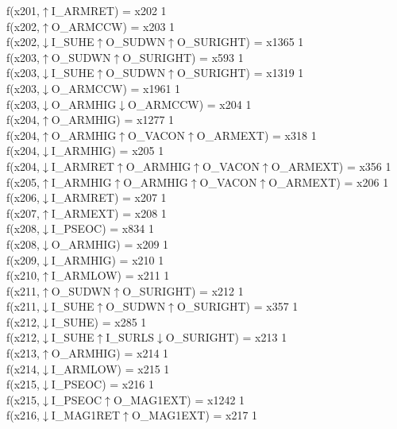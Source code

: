 f(x201,$\uparrow$I\_ARMRET) = x202 {1} \\
f(x202,$\uparrow$O\_ARMCCW) = x203 {1} \\
f(x202,$\downarrow$I\_SUHE$\uparrow$O\_SUDWN$\uparrow$O\_SURIGHT) = x1365 {1} \\
f(x203,$\uparrow$O\_SUDWN$\uparrow$O\_SURIGHT) = x593 {1} \\
f(x203,$\downarrow$I\_SUHE$\uparrow$O\_SUDWN$\uparrow$O\_SURIGHT) = x1319 {1} \\
f(x203,$\downarrow$O\_ARMCCW) = x1961 {1} \\
f(x203,$\downarrow$O\_ARMHIG$\downarrow$O\_ARMCCW) = x204 {1} \\
f(x204,$\uparrow$O\_ARMHIG) = x1277 {1} \\
f(x204,$\uparrow$O\_ARMHIG$\uparrow$O\_VACON$\uparrow$O\_ARMEXT) = x318 {1} \\
f(x204,$\downarrow$I\_ARMHIG) = x205 {1} \\
f(x204,$\downarrow$I\_ARMRET$\uparrow$O\_ARMHIG$\uparrow$O\_VACON$\uparrow$O\_ARMEXT) = x356 {1} \\
f(x205,$\uparrow$I\_ARMHIG$\uparrow$O\_ARMHIG$\uparrow$O\_VACON$\uparrow$O\_ARMEXT) = x206 {1} \\
f(x206,$\downarrow$I\_ARMRET) = x207 {1} \\
f(x207,$\uparrow$I\_ARMEXT) = x208 {1} \\
f(x208,$\downarrow$I\_PSEOC) = x834 {1} \\
f(x208,$\downarrow$O\_ARMHIG) = x209 {1} \\
f(x209,$\downarrow$I\_ARMHIG) = x210 {1} \\
f(x210,$\uparrow$I\_ARMLOW) = x211 {1} \\
f(x211,$\uparrow$O\_SUDWN$\uparrow$O\_SURIGHT) = x212 {1} \\
f(x211,$\downarrow$I\_SUHE$\uparrow$O\_SUDWN$\uparrow$O\_SURIGHT) = x357 {1} \\
f(x212,$\downarrow$I\_SUHE) = x285 {1} \\
f(x212,$\downarrow$I\_SUHE$\uparrow$I\_SURLS$\downarrow$O\_SURIGHT) = x213 {1} \\
f(x213,$\uparrow$O\_ARMHIG) = x214 {1} \\
f(x214,$\downarrow$I\_ARMLOW) = x215 {1} \\
f(x215,$\downarrow$I\_PSEOC) = x216 {1} \\
f(x215,$\downarrow$I\_PSEOC$\uparrow$O\_MAG1EXT) = x1242 {1} \\
f(x216,$\downarrow$I\_MAG1RET$\uparrow$O\_MAG1EXT) = x217 {1} \\
